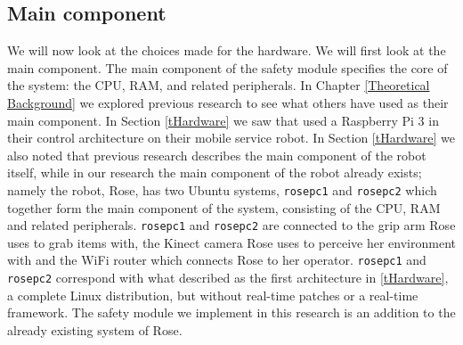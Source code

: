 \documentclass[12pt]{scrreprt}
\begin{document}
\subsection{Main component}
\label{Main component}
We will now look at the choices made for the hardware. We will first look at the main component. The main component of the safety module specifies the core of the system: the CPU, RAM, and related peripherals. In Chapter \ref{Theoretical Background} we explored previous research to see what others have used as their main component. In Section \ref{tHardware} we saw that \citeauthor{delgado} used a Raspberry Pi 3 in their control architecture on their mobile service robot. In Section  \ref{tHardware} we also noted that previous research describes the main component of the robot itself, while in our research the main component of the robot already exists; namely the robot, Rose, has two Ubuntu systems, \texttt{rosepc1} and \texttt{rosepc2} which together form the main component of the system, consisting of the CPU, RAM and related peripherals. \texttt{rosepc1} and \texttt{rosepc2} are connected to the grip arm Rose uses to grab items with, the Kinect camera Rose uses to perceive her environment with and the WiFi router which connects Rose to her operator. \texttt{rosepc1} and \texttt{rosepc2} correspond with what \citeauthor{bouchier} described as the first architecture in \ref{tHardware}, a complete Linux distribution, but without real-time patches or a real-time framework. The safety module we implement in this research is an addition to the already existing system of Rose.\\
\end{document}
